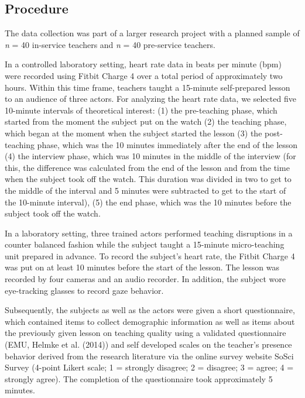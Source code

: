 \documentclass[
  man]{apa6}
\begin{document}
\hypertarget{procedure}{%
\subsection{Procedure}\label{procedure}}

The data collection was part of a larger research project with a planned sample of \emph{n} = 40 in-service teachers and \emph{n} = 40 pre-service teachers.

In a controlled laboratory setting, heart rate data in beats per minute (bpm) were recorded using Fitbit Charge 4 over a total period of approximately two hours. Within this time frame, teachers taught a 15-minute self-prepared lesson to an audience of three actors. For analyzing the heart rate data, we selected five 10-minute intervals of theoretical interest:
(1) the pre-teaching phase, which started from the moment the subject put on the watch
(2) the teaching phase, which began at the moment when the subject started the lesson
(3) the post-teaching phase, which was the 10 minutes immediately after the end of the lesson
(4) the interview phase, which was 10 minutes in the middle of the interview (for this, the difference was calculated from the end of the lesson and from the time when the subject took off the watch. This duration was divided in two to get to the middle of the interval and 5 minutes were subtracted to get to the start of the 10-minute interval),
(5) the end phase, which was the 10 minutes before the subject took off the watch.

In a laboratory setting, three trained actors performed teaching disruptions in a counter balanced fashion while the subject taught a 15-minute micro-teaching unit prepared in advance. To record the subject's heart rate, the Fitbit Charge 4 was put on at least 10 minutes before the start of the lesson. The lesson was recorded by four cameras and an audio recorder. In addition, the subject wore eye-tracking glasses to record gaze behavior.

Subsequently, the subjects as well as the actors were given a short questionnaire, which contained items to collect demographic information as well as items about the previously given lesson on teaching quality using a validated questionnaire (EMU, Helmke et al. (2014)) and self developed scales on the teacher's presence behavior derived from the research literature via the online survey website SoSci Survey (4-point Likert scale; 1 = strongly disagree; 2 = disagree; 3 = agree; 4 = strongly agree). The completion of the questionnaire took approximately 5 minutes.
\end{document}
